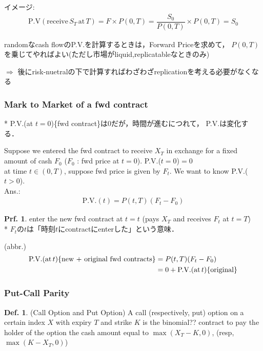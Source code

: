 \documentclass[a4paper,11pt]{jsarticle}
\theoremstyle{definition}
\newtheorem{definition}{Def.}[subsection]
\newtheorem{prf}{Prf.}[subsection]
\newcommand{\df}[2]{\dfrac{#1}{#2}}
\begin{document}
イメージ:
\begin{align}
  \mbox{P.V}(\mbox{receive} \, S_T \,\mbox{at} \, T)
  =F\times P(0,T)=\df{S_0}{P(0,T)}\times P(0,T)=S_0
\end{align}

randomなcash flowのP.V.を計算するときは，Forward Priceを求めて，
$P(0,T)$を乗じてやればよい(ただし市場がliquid,replicatableなときのみ)

$\Rightarrow$ 後にrisk-nuetralの下で計算すればわざわざreplicationを考える必要がなくなる


\subsubsection{Mark to Market of a fwd contract}
* P.V.(at $t=0$)\{fwd contract\}は0だが，時間が進むにつれて，
P.V.は変化する．

Suppose we entered the fwd contract to receive $X_T$
in exchange for a fixed amount of cash $F_0$
($F_0$ : fwd price at $t=0$). P.V.($t=0$)$=0$ \\
at time $t\in(0,T)$, suppose fwd price is given by $F_t$.
We want to know P.V.($t>0$).\\
Ans.:
\begin{align}
  \mbox{P.V.}(t)=P(t,T)(F_t-F_0)
\end{align}
\begin{prf}
  enter the new fwd contract at $t=t$
  (pays $X_T$ and receives $F_t$ at $t=T$) \\
  * $F_t$の$t$は「時刻$t$にcontractにenterした」という意味．

  (abbr.)
  \begin{align}
    \mbox{P.V.}(\mbox{at}\, t)
    \{\mbox{new + original fwd contracts}\}
    &=P(t,T)(F_t-F_0) \notag \\
    &=0+\mbox{P.V.}(\mbox{at}\, t)\{\mbox{original}\}
  \end{align}
\end{prf}

\subsubsection{Put-Call Parity}
\begin{definition}{(Call Option and Put Option)}
  A call (respectively, put) option on a certain index $X$
  with expiry $T$ and strike $K$ is the binomial?? contract
  to pay the holder of the option the cash amount equal to
  $\max(X_T-K,0)$, (resp, $\max(K-X_T,0)$)
\end{definition}
\end{document}
